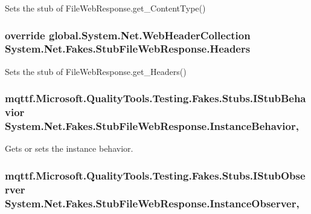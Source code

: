 Sets the stub of File\-Web\-Response.\-get\-\_\-\-Content\-Type()

\hypertarget{class_system_1_1_net_1_1_fakes_1_1_stub_file_web_response_ab5aec47f110b9e2e155ff188ab11cbc2}{
\subsubsection[{Headers}]{\setlength{\rightskip}{0pt plus 5cm}override global.\-System.\-Net.\-Web\-Header\-Collection System.\-Net.\-Fakes.\-Stub\-File\-Web\-Response.\-Headers\hspace{0.3cm}{\ttfamily [get]}}}\label{class_system_1_1_net_1_1_fakes_1_1_stub_file_web_response_ab5aec47f110b9e2e155ff188ab11cbc2}


Sets the stub of File\-Web\-Response.\-get\-\_\-\-Headers()

\hypertarget{class_system_1_1_net_1_1_fakes_1_1_stub_file_web_response_a724e44910e29e1b5b8288212161ac103}{
\subsubsection[{Instance\-Behavior}]{\setlength{\rightskip}{0pt plus 5cm}mqttf.\-Microsoft.\-Quality\-Tools.\-Testing.\-Fakes.\-Stubs.\-I\-Stub\-Behavior System.\-Net.\-Fakes.\-Stub\-File\-Web\-Response.\-Instance\-Behavior\hspace{0.3cm}{\ttfamily [get]}, {\ttfamily [set]}}}\label{class_system_1_1_net_1_1_fakes_1_1_stub_file_web_response_a724e44910e29e1b5b8288212161ac103}


Gets or sets the instance behavior.

\hypertarget{class_system_1_1_net_1_1_fakes_1_1_stub_file_web_response_a9620542766ec9aaefff4fbc01f39f591}{
\subsubsection[{Instance\-Observer}]{\setlength{\rightskip}{0pt plus 5cm}mqttf.\-Microsoft.\-Quality\-Tools.\-Testing.\-Fakes.\-Stubs.\-I\-Stub\-Observer System.\-Net.\-Fakes.\-Stub\-File\-Web\-Response.\-Instance\-Observer\hspace{0.3cm}{\ttfamily [get]}, {\ttfamily [set]}}}\label{class_system_1_1_net_1_1_fakes_1_1_stub_file_web_response_a9620542766ec9aaefff4fbc01f39f591}


